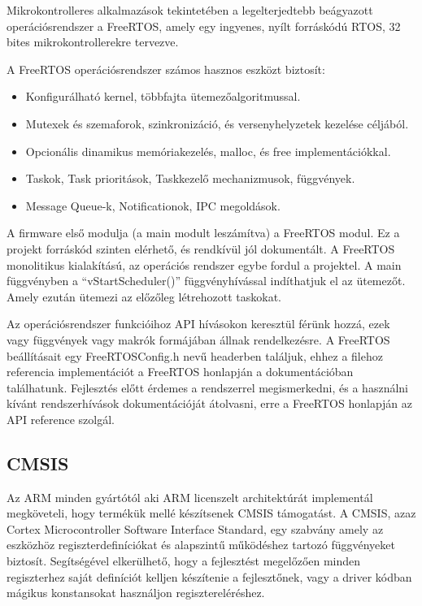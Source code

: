 Mikrokontrolleres alkalmazások tekintetében a legelterjedtebb beágyazott
operációsrendszer a FreeRTOS, amely egy ingyenes, nyílt forráskódú RTOS, 32 bites
mikrokontrollerekre tervezve.

A FreeRTOS operációsrendszer számos hasznos eszközt biztosít:

\begin{itemize}
\item{Konfigurálható kernel, többfajta ütemezőalgoritmussal.}
\item{Mutexek és szemaforok, szinkronizáció, és versenyhelyzetek kezelése
  céljából.}
\item{Opcionális dinamikus memóriakezelés, malloc, és free implementációkkal.}
\item{Taskok, Task prioritások, Taskkezelő mechanizmusok, függvények.}
\item{Message Queue-k, Notificationok, IPC megoldások.}
\end{itemize}

A firmware első modulja (a main modult leszámítva) a FreeRTOS modul. Ez a projekt
forráskód szinten elérhető, és rendkívül jól dokumentált. A FreeRTOS monolitikus
kialakítású, az operációs rendszer egybe fordul a projektel. A main függvényben a
``vStartScheduler()'' függvényhívással indíthatjuk el az ütemezőt. Amely ezután
ütemezi az előzőleg létrehozott taskokat.

Az operációsrendszer funkcióihoz API hívásokon keresztül férünk hozzá, ezek vagy
függvények vagy makrók formájában állnak rendelkezésre. A FreeRTOS beállításait
egy FreeRTOSConfig.h nevű headerben találjuk, ehhez a filehoz referencia
implementációt a FreeRTOS honlapján a dokumentációban találhatunk. Fejlesztés
előtt érdemes a rendszerrel megismerkedni, és a használni kívánt rendszerhívások
dokumentációját átolvasni, erre a FreeRTOS honlapján az API reference szolgál.


\subsection{CMSIS}

Az ARM minden gyártótól aki ARM licenszelt architektúrát implementál megköveteli,
hogy termékük mellé készítsenek CMSIS támogatást. A CMSIS, azaz Cortex
Microcontroller Software Interface Standard, egy szabvány amely az eszközhöz
regiszterdefiníciókat és alapszintű működéshez tartozó függvényeket
biztosít. Segítségével elkerülhető, hogy a fejlesztést megelőzően minden
regiszterhez saját definíciót kelljen készítenie a fejlesztőnek, vagy a driver
kódban mágikus konstansokat használjon regisztereléréshez.

